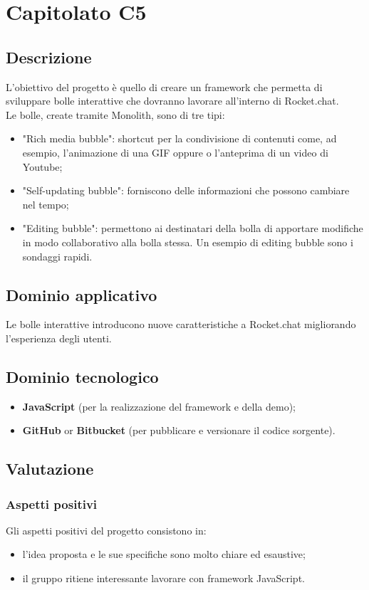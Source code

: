 \section {Capitolato C5}
	\subsection {Descrizione}
		L'obiettivo del progetto è quello di creare un framework che permetta di sviluppare bolle interattive che dovranno lavorare all'interno di Rocket.chat. \\
		Le bolle, create tramite Monolith, sono di tre tipi:
		\begin{itemize}
			\item "Rich media bubble": shortcut per la condivisione di contenuti come, ad esempio, l'animazione di una GIF oppure o l'anteprima di un video di Youtube;
			\item "Self-updating bubble": forniscono delle informazioni che possono cambiare nel tempo;
			\item "Editing bubble": permettono ai destinatari della bolla di apportare modifiche in modo collaborativo alla bolla stessa. Un esempio di editing bubble sono i sondaggi rapidi.
		\end{itemize}
	\subsection {Dominio applicativo}
		Le bolle interattive introducono nuove caratteristiche a Rocket.chat migliorando l'esperienza degli utenti.
	\subsection {Dominio tecnologico}
		\begin{itemize}
		\item \textbf{JavaScript} (per la realizzazione del framework e della demo);
		\item \textbf{GitHub} or \textbf{Bitbucket} (per pubblicare e versionare il codice sorgente).
		\end{itemize}
	\subsection {Valutazione}
		\subsubsection {Aspetti positivi}
		Gli aspetti positivi del progetto consistono in:
			\begin{itemize}
				\item l’idea proposta e le sue specifiche sono molto chiare ed esaustive;
				\item il gruppo ritiene interessante lavorare con framework JavaScript.
			\end{itemize}
